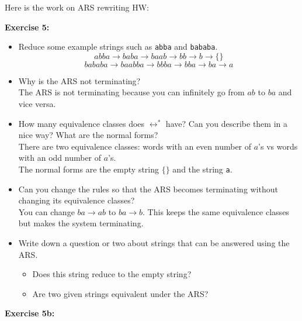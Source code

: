 \documentclass{article}
\theoremstyle{theorem}
\theoremstyle{definition}
\theoremstyle{remark}
\begin{document}
Here is the work on ARS rewriting HW:


\textbf{Exercise 5:}

\begin{itemize}
    \item Reduce some example strings such as \texttt{abba} and \texttt{bababa}.
    \[
    abba \to baba \to baab \to bb \to b \to \{\}
    \]
    \[
    bababa \to baabba \to bbba \to bba \to ba \to a
    \]

    \item Why is the ARS not terminating? \\
    The ARS is not terminating because you can infinitely go from $ab$ to $ba$ and vice versa.

    \item How many equivalence classes does $\leftrightarrow^*$ have? Can you describe them in a nice way? What are the normal forms? \\
    There are two equivalence classes: words with an even number of $a$’s vs words with an odd number of $a$’s. \\
    The normal forms are the empty string $\{\}$ and the string \texttt{a}.

    \item Can you change the rules so that the ARS becomes terminating without changing its equivalence classes? \\
    You can change $ba \to ab$ to $ba \to b$. This keeps the same equivalence classes but makes the system terminating.

    \item Write down a question or two about strings that can be answered using the ARS. \\
    \begin{itemize}
        \item Does this string reduce to the empty string?
        \item Are two given strings equivalent under the ARS?
    \end{itemize}
\end{itemize}

\bigskip

\textbf{Exercise 5b:}
\end{document}

